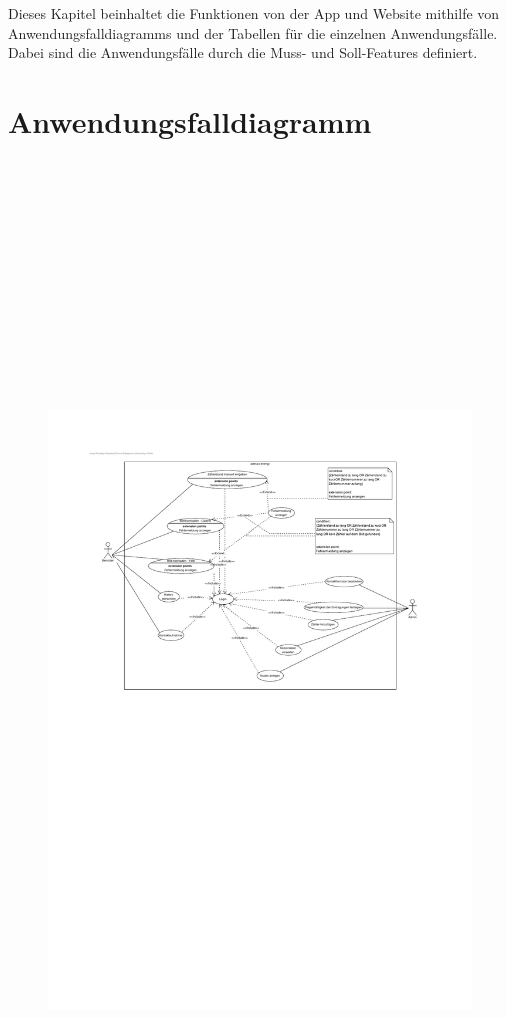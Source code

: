 Dieses Kapitel beinhaltet die Funktionen von der App und Website mithilfe von Anwendungsfalldiagramms und der Tabellen für die einzelnen Anwendungsfälle.
Dabei sind die Anwendungsfälle durch die Muss- und Soll-Features definiert.

\section{Anwendungsfalldiagramm}

\begin{figure}[H]

	\hspace{-5cm}
	\includegraphics[width=25 cm, height = 40cm]{./img/mustCase}

\end{figure}
